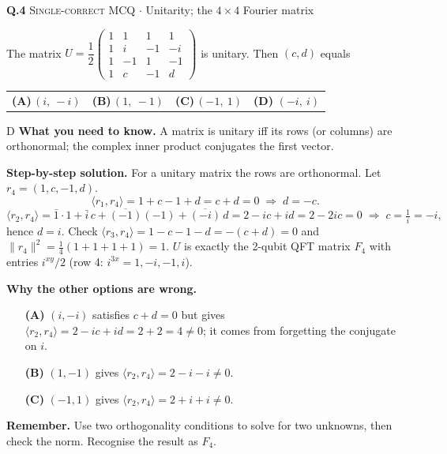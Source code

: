 \documentclass[11pt,a4paper]{article}
\newcommand{\optlabel}[1]{\textbf{(#1)}}
\newcommand{\correctlabel}[1]{\textcolor{okgreen}{\textbf{(#1)}\,\ding{51}}}
\newenvironment{qitem}[1]{\begin{list}{}{\setlength{\leftmargin}{3.3em}\setlength{\labelwidth}{3.1em}%
  \setlength{\labelsep}{0.2em}\setlength{\topsep}{3pt}\setlength{\parsep}{3pt}}\item[\textbf{Q.#1}\hfill]}{\end{list}}
\newcommand{\qsep}{\par\vspace{2pt}{\color{black!15}\hrule}\vspace{4pt}}
\newcommand{\qmeta}[2]{{\footnotesize\color{black!60}\textsc{#1} \;$\cdot$\; #2}\par}
\begin{document}
\begin{qitem}{4}
\qmeta{Single-correct MCQ}{Unitarity; the $4\times4$ Fourier matrix}
The matrix $U = \dfrac12\begin{pmatrix}1&1&1&1\\ 1&i&-1&-i\\ 1&-1&1&-1\\ 1&c&-1&d\end{pmatrix}$ is unitary. Then $(c, d)$ equals
\par\smallskip\noindent\begin{tabularx}{\linewidth}{@{}*{4}{L}@{}}
\optlabel{A}\,$(i,\ -i)$ & \optlabel{B}\,$(1,\ -1)$ & \optlabel{C}\,$(-1,\ 1)$ & \correctlabel{D}\,$(-i,\ i)$
\end{tabularx}
\end{qitem}
\begin{solbox}{D}
\textbf{\color{brand}What you need to know.} A matrix is unitary iff its rows (or columns) are orthonormal; the complex inner product conjugates the first vector.

\textbf{\color{brand}Step-by-step solution.} For a unitary matrix the rows are orthonormal. Let $r_4 = (1, c, -1, d)$.
\[ \langle r_1, r_4\rangle = 1 + c - 1 + d = c + d = 0 \;\Rightarrow\; d = -c. \]
\[ \langle r_2, r_4\rangle = \bar1\cdot1 + \bar i\,c + \overline{(-1)}(-1) + \overline{(-i)}\,d = 2 - ic + id = 2 - 2ic = 0 \;\Rightarrow\; c = \tfrac{1}{i} = -i, \]
hence $d = i$. Check $\langle r_3, r_4\rangle = 1 - c - 1 - d = -(c+d) = 0$ and $\|r_4\|^2 = \tfrac14(1+1+1+1) = 1$.
$U$ is exactly the 2-qubit QFT matrix $F_4$ with entries $i^{xy}/2$ (row 4: $i^{3x} = 1, -i, -1, i$).

\textbf{\color{brand}Why the other options are wrong.}
\begin{itemize}[leftmargin=2.4em, itemsep=1pt, topsep=2pt]
\item[\textbf{(A)}] $(i, -i)$ satisfies $c + d = 0$ but gives $\langle r_2, r_4\rangle = 2 - ic + id = 2 + 2 = 4 \neq 0$; it comes from forgetting the conjugate on $i$.
\item[\textbf{(B)}] $(1, -1)$ gives $\langle r_2, r_4\rangle = 2 - i - i \neq 0$.
\item[\textbf{(C)}] $(-1, 1)$ gives $\langle r_2, r_4\rangle = 2 + i + i \neq 0$.
\end{itemize}
\textbf{\color{brand}Remember.} Use two orthogonality conditions to solve for two unknowns, then check the norm. Recognise the result as $F_4$.
\end{solbox}
\qsep
\end{document}
